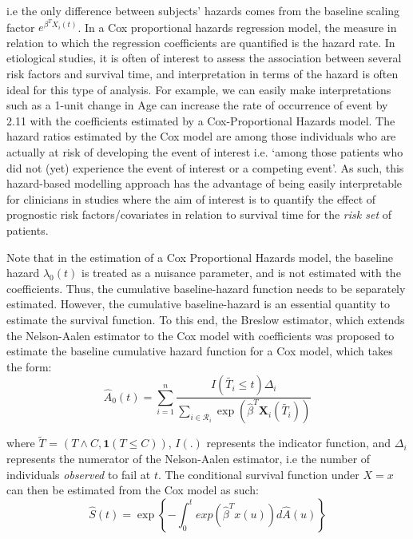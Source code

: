 i.e the only difference between subjects' hazards comes from the baseline scaling factor $e^{\beta^T X_i(t)}$. In a Cox proportional hazards regression model, the measure in relation to which the regression coefficients are quantified is the hazard rate. In etiological studies, it is often of interest to assess the association between several risk factors and survival time, and interpretation in terms of the hazard is often ideal for this type of analysis. For example, we can easily make interpretations such as a 1-unit change in Age can increase the rate of occurrence of event by 2.11 with the coefficients estimated by a Cox-Proportional Hazards model. The hazard ratios estimated by the Cox model are among those individuals who are actually at risk of developing the event of interest i.e. ‘among those patients who did not (yet) experience the event of interest or a competing event’. As such, this hazard-based modelling approach has the advantage of being easily interpretable for clinicians in studies where the aim of interest is to quantify the effect of prognostic risk factors/covariates in relation to survival time for the \textit{risk set} of patients. 
\smallskip\par
Note that in the estimation of a Cox Proportional Hazards model, the baseline hazard $\lambda_0 (t)$ is treated as a nuisance parameter, and is not estimated with the coefficients. Thus, the cumulative baseline-hazard function needs to be separately estimated. However, the cumulative baseline-hazard is an essential quantity to estimate the survival function. To this end, the Breslow estimator, which extends the Nelson-Aalen estimator to the Cox model with coefficients was proposed to estimate the baseline cumulative hazard function for a Cox model, which takes the form: 
\begin{equation}
\hat{A}_0(t) = \sum_{i =1}^{n} \frac{I(\tilde{T_i} \leq t) \Delta_i}{\sum_{i \in \mathcal{R}_i} \exp(\hat{\beta}^T \mathbf{X}_i(\tilde{T_i}))}
\end{equation}

where  $\tilde{T}$ = $(T \wedge C, \textbf{1}(T \leq C))$, $I(.)$ represents the indicator function, and $\Delta_i$ represents the numerator of the Nelson-Aalen estimator, i.e the number of individuals \textit{observed} to fail at $t$. The conditional survival function under $X = x$ can then be estimated from the Cox model as such:
\begin{equation}
\hat{S}(t) = \exp \left\{ - \int_{0}^{t} exp(\hat{\beta}^T x(u)) d\hat{A}(u) \right\}
\end{equation}

